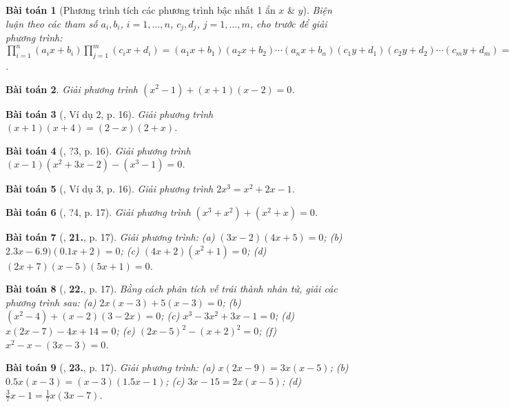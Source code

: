 \documentclass{article}
\numberwithin{equation}{section}
\newtheorem{baitoan}{Bài toán}
\begin{document}
\begin{baitoan}[Phương trình tích các phương trình bậc nhất 1 ẩn $x$ \& $y$]
	Biện luận theo các tham số $a_i,b_i$, $i = 1,\ldots,n$, $c_j,d_j$, $j = 1,\ldots,m$, cho trước để giải phương trình: $\prod_{i=1}^n (a_ix + b_i)\prod_{j=1}^m (c_ix + d_i) = (a_1x + b_1)(a_2x + b_2)\cdots(a_nx + b_n)(c_1y + d_1)(c_2y + d_2)\cdots(c_my + d_m) = 0$.
\end{baitoan}

\begin{baitoan}
	Giải phương trình $(x^2 - 1) + (x + 1)(x - 2) = 0$.
\end{baitoan}

\begin{baitoan}[\cite{SGK_Toan_8_tap_2}, Ví dụ 2, p. 16]
	Giải phương trình $(x + 1)(x + 4) = (2 - x)(2 + x)$.
\end{baitoan}

\begin{baitoan}[\cite{SGK_Toan_8_tap_2}, ?3, p. 16]
	Giải phương trình $(x - 1)(x^2 + 3x - 2) - (x^3 - 1) = 0$.
\end{baitoan}

\begin{baitoan}[\cite{SGK_Toan_8_tap_2}, Ví dụ 3, p. 16]
	Giải phương trình $2x^3 = x^2 + 2x - 1$.
\end{baitoan}

\begin{baitoan}[\cite{SGK_Toan_8_tap_2}, ?4, p. 17]
	Giải phương trình $(x^3 + x^2) + (x^2 + x) = 0$.
\end{baitoan}

\begin{baitoan}[\cite{SGK_Toan_8_tap_2}, \textbf{21.}, p. 17]
	Giải phương trình: (a) $(3x - 2)(4x + 5) = 0$; (b) $2.3x - 6.9)(0.1x + 2) = 0$; (c) $(4x + 2)(x^2 + 1) = 0$; (d) $(2x + 7)(x - 5)(5x + 1) = 0$.
\end{baitoan}

\begin{baitoan}[\cite{SGK_Toan_8_tap_2}, \textbf{22.}, p. 17]
	Bằng cách phân tích vế trái thành nhân tử, giải các phương trình sau: (a) $2x(x - 3) + 5(x - 3) = 0$; (b) $(x^2 - 4) + (x - 2)(3 - 2x) = 0$; (c) $x^3 - 3x^2 + 3x - 1 = 0$; (d) $x(2x - 7) - 4x + 14 = 0$; (e) $(2x - 5)^2 - (x + 2)^2 = 0$; (f) $x^2 - x - (3x - 3) = 0$.
\end{baitoan}

\begin{baitoan}[\cite{SGK_Toan_8_tap_2}, \textbf{23.}, p. 17]
	Giải phương trình: (a) $x(2x - 9) = 3x(x - 5)$; (b) $0.5x(x - 3) = (x - 3)(1.5x - 1)$; (c) $3x - 15 = 2x(x - 5)$; (d) $\frac{3}{7}x - 1 = \frac{1}{7}x(3x - 7)$.
\end{baitoan}
\end{document}

